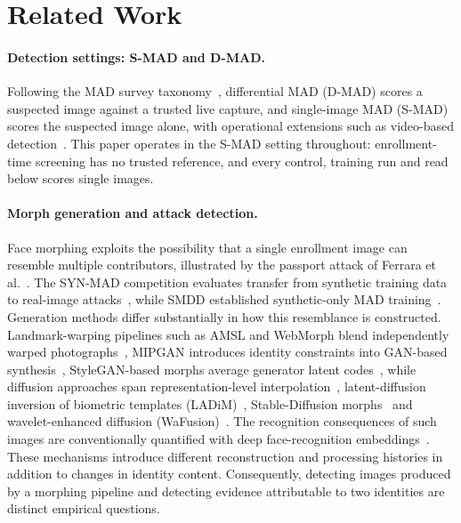 \section{Related Work}
\label{sec:related}
\paragraph{Detection settings: S-MAD and D-MAD.}
Following the MAD survey taxonomy~\cite{venkatesh2021survey}, differential MAD (D-MAD) scores a suspected image against a trusted live capture, and single-image MAD (S-MAD) scores the suspected image alone, with operational extensions such as video-based detection~\cite{borghi2024vmad}. This paper operates in the S-MAD setting throughout: enrollment-time screening has no trusted reference, and every control, training run and read below scores single images.

\paragraph{Morph generation and attack detection.}
Face morphing exploits the possibility that a single enrollment image can resemble multiple contributors, illustrated by the passport attack of Ferrara et al.~\cite{ferrara2014magic}. The SYN-MAD competition evaluates transfer from synthetic training data to real-image attacks~\cite{huber2022synmad}, while SMDD established synthetic-only MAD training~\cite{damer2022smdd}. Generation methods differ substantially in how this resemblance is constructed. Landmark-warping pipelines such as AMSL and WebMorph blend independently warped photographs~\cite{neubert2018amsl,debruine2018webmorph}, MIPGAN introduces identity constraints into GAN-based synthesis~\cite{zhang2021mipgan}, StyleGAN-based morphs average generator latent codes~\cite{sarkar2022styleganmorphs}, while diffusion approaches span representation-level interpolation~\cite{damer2023mordiff}, latent-diffusion inversion of biometric templates (LADiM)~\cite{grimmer2024ladimo}, Stable-Diffusion morphs~\cite{spreeuwers2025stablemorph} and wavelet-enhanced diffusion (WaFusion)~\cite{wafusion2025}. The recognition consequences of such images are conventionally quantified with deep face-recognition embeddings~\cite{deng2019arcface,meng2021magface}. These mechanisms introduce different reconstruction and processing histories in addition to changes in identity content. Consequently, detecting images produced by a morphing pipeline and detecting evidence attributable to two identities are distinct empirical questions.

